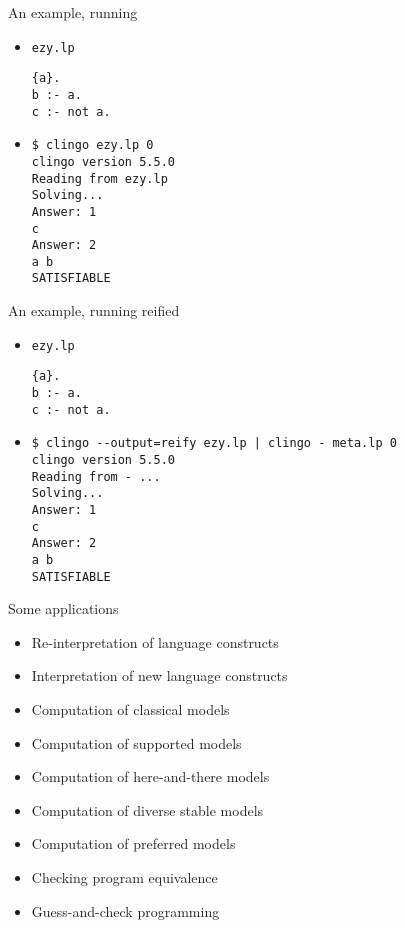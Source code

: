 \begin{frame}[fragile]{An example, running}
  \begin{itemize}
  \item {} \texttt{ezy.lp}
\begin{lstlisting}
{a}.
b :- a.
c :- not a.
\end{lstlisting}
  \item<2-> 
\begin{lstlisting}[basicstyle=\small\ttfamily]
$ clingo ezy.lp 0
clingo version 5.5.0
Reading from ezy.lp
Solving...
Answer: 1
c
Answer: 2
a b
SATISFIABLE
\end{lstlisting}
  \end{itemize}
\end{frame}
\begin{frame}[fragile]{An example, running reified}
  \begin{itemize}
  \item {} \texttt{ezy.lp}
\begin{lstlisting}
{a}.
b :- a.
c :- not a.
\end{lstlisting}
  \item<2-> 
\begin{lstlisting}[basicstyle=\small\ttfamily]
$ clingo --output=reify ezy.lp | clingo - meta.lp 0
clingo version 5.5.0
Reading from - ...
Solving...
Answer: 1
c
Answer: 2
a b
SATISFIABLE
\end{lstlisting}
  \end{itemize}
\end{frame}
\begin{frame}{Some applications}
  \begin{itemize}
  \item Re-interpretation of language constructs
  \item Interpretation of new language constructs
    \medskip
  \item Computation of classical models
  \item Computation of supported models
  \item Computation of here-and-there models
  \item Computation of diverse stable models
  \item Computation of preferred models
    \medskip
  \item Checking program equivalence
    \medskip
  \item Guess-and-check programming
  \end{itemize}
\end{frame}
%
